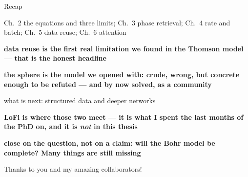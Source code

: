 \documentclass[aspectratio=169,11pt]{beamer}
\begin{document}
\begin{frame}{Recap}
{\begin{notelist}
    \item Ch.~2 the equations and three limits; Ch.~3 phase retrieval; Ch.~4 rate
      and batch; Ch.~5 data reuse; Ch.~6 attention
    \item \textbf{data reuse is the first real limitation we found in the Thomson
      model --- that is the honest headline}
    \item \textbf{the sphere is the model we opened with: crude, wrong, but concrete
      enough to be refuted --- and by now solved, as a community}
    \item what is next: structured data and deeper networks
    \item \textbf{LoFi is where those two meet --- it is what I spent the last
      months of the PhD on, and it is \emph{not} in this thesis}
    \item \textbf{close on the question, not on a claim: will the Bohr model be
      complete? Many things are still missing}
  \end{notelist}}
\end{frame}

\begin{frame}{Thanks to you and my amazing collaborators!}
  \vfill
  \noindent{}
  \vspace{1.em}

  \noindent{}
  \vfill
\end{frame}
\end{document}
